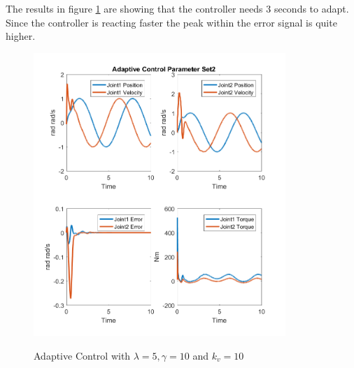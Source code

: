 The results in figure \ref{fig:ch6_adap2} are showing that the controller needs 3 seconds to adapt. Since the controller is reacting faster the peak within the error signal is quite higher.
\begin{figure}[]
	\centering
	\includegraphics[width=0.85\textwidth]{pics/AdaptiveControlParameterSet2.png}\\
	\caption{Adaptive Control with $\lambda = 5, \gamma=10 $ and $k_v = 10$  }
	\label{fig:ch6_adap2}
\end{figure}

